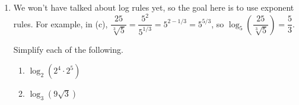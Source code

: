 \documentclass{article}
\begin{document}
\begin{enumerate}
\begin{enumerate}
  \item \label{ln-transformed}
    \begin{problem}[1in]
      On the same axes, sketch the graph of $g(x) = \ln(2x)$ in a different color. How does the graph of $g$ relate to the graph of $f$? (That is, what transformation should you do to the graph of $f$ to get the graph of $g$?) Where do the intercepts, asymptotes, and points you labeled in \ref{ln-points} move to? Label them on the graph. 
    \end{problem}

  \item

    \begin{workshop}
      One good check is to make sure the labeled points on the graph of $g$ actually satisfy the equation $y = \ln(2x)$. For example, if you moved the point $(e, 1)$ to $\left( \dfrac{e}{2}, 1 \right)$, you can check that $\ln \left( 2 \cdot \dfrac{e}{2} \right)$ really is 1. 
    \end{workshop}

    \begin{problem}[\stretch{1.5}]
      How can you check that your answer to \ref{ln-transformed} is reasonable?
    \end{problem}

  \end{enumerate}

\item 

  \begin{workshop}
    We won't have talked about log rules yet, so the goal here is to use exponent rules. For example, in (c), $\dfrac{25}{\sqrt[3]{5}} = \dfrac{5^2}{5^{1/3}} = 5^{2 - 1/3} = 5^{5/3}$, so $\log_5 \left( \dfrac{25}{\sqrt[3]{5}} \right) = \dfrac{5}{3}$.
  \end{workshop}

  Simplify each of the following.

  \begin{enumerate}
  \item
    \begin{problem}[\vfill]
      $\log_2 \left( 2^4 \cdot 2^5 \right)$
    \end{problem}

  \item
    \begin{problem}[\vfill]
      $\log_3 \left( 9 \sqrt{3} \right)$
    \end{problem}


\end{enumerate}
\end{enumerate}
\end{document}
